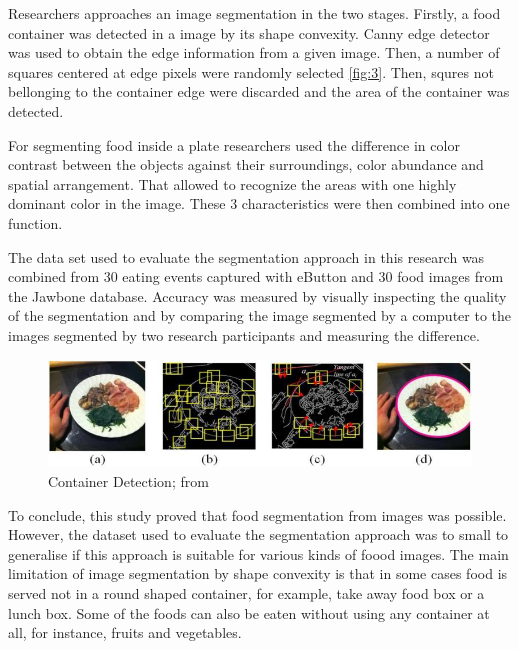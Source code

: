 Researchers approaches an image segmentation in the two stages. Firstly, a food container was detected in a image by its shape convexity.  Canny edge detector was  used to obtain the edge information from a given image. Then, a number of squares centered at edge pixels were randomly selected \autoref{fig:3}. Then, squres not bellonging to the container edge were discarded and the area of the container was detected.

For segmenting  food inside a plate researchers used the difference in color contrast between the objects against their surroundings, color abundance and spatial arrangement. That allowed to recognize the areas with one highly dominant color in the image. These 3 characteristics were then combined into one function.

The data set used to evaluate the segmentation approach in this research was combined from 30 eating events captured with eButton and 30 food images from the Jawbone database. Accuracy was measured by visually inspecting the quality of the segmentation and by comparing the image segmented by a computer to the images segmented by two research participants and measuring the difference. 



\begin{figure}[ht]
\includegraphics{Figures/2/segm_03.jpg}
\caption{Container Detection;  from \citep{chen2015saliency}}
\label{fig:3}
\end{figure}
To conclude, this study proved that food segmentation from images was possible. However, the dataset used to evaluate the segmentation approach was to small to generalise if this approach is suitable for various kinds of foood images.
The main limitation of image segmentation by  shape convexity is that in some cases food is served not in a round shaped container, for example, take away food box or a lunch box. Some of the foods can also be eaten without using any container at all, for instance, fruits and vegetables.

